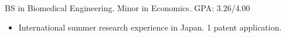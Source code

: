 \documentclass[margin]{res}
\begin{document}
\begin{sloppypar}
\begin{resume}




\\
BS in Biomedical Engineering. Minor in Economics. GPA: 3.26/4.00
\begin{itemize}
    \item International summer research experience in Japan. 1 patent application.
\end{itemize}


\end{resume}
\end{sloppypar}
\end{document}
